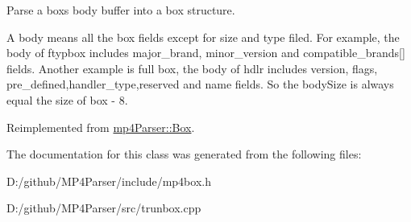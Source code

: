 Parse a box\textquotesingle{}s body buffer into a box structure. 

A body means all the box fields except for size and type filed. For example, the body of ftypbox includes major\+\_\+brand, minor\+\_\+version and compatible\+\_\+brands\mbox{[}\mbox{]} fields. Another example is full box, the body of hdlr includes version, flags, pre\+\_\+defined,handler\+\_\+type,reserved and name fields. So the body\+Size is always equal the size of box -\/ 8. 

Reimplemented from \mbox{\hyperlink{classmp4_parser_1_1_box_a3dd0c084ac65bc77b69ac5ecaf796cb2}{mp4\+Parser\+::\+Box}}.



The documentation for this class was generated from the following files\+:\begin{DoxyCompactItemize}
\item 
D\+:/github/\+M\+P4\+Parser/include/mp4box.\+h\item 
D\+:/github/\+M\+P4\+Parser/src/trunbox.\+cpp\end{DoxyCompactItemize}
